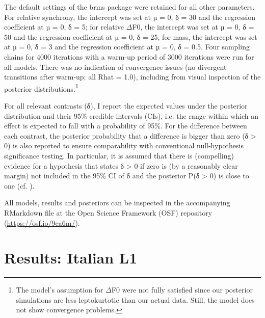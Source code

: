 The default settings of the brms package were retained for all other parameters. For relative synchrony, the intercept was set at µ = 0, δ = 30 and the regression coefficient at µ = 0, δ = 5; for relative ${\Delta}$F0, the intercept was set at µ = 0, δ = 50 and the regression coefficient at µ = 0, δ = 25, for mass, the intercept was set at µ = 0, δ = 3 and the regression coefficient at µ = 0, δ = 0.5. Four sampling chains for 4000 iterations with a warm-up period of 3000 iterations were run for all models. There was no indication of convergence issues (no divergent transitions after warm-up; all Rhat = 1.0), including from visual inspection of the posterior distributions.\footnote{The model’s assumption for \textrm{${\Delta}$}F0 were not fully satisfied since our posterior simulations are less leptokurtotic than our actual data. Still, the model does not show convergence problems.}

For all relevant contrasts (δ), I report the expected values under the posterior distribution and their 95\% credible intervals (CIs), i.e. the range within which an effect is expected to fall with a probability of 95\%. For the difference between each contrast, the posterior probability that a difference is bigger than zero (δ > 0) is also reported to ensure comparability with conventional null-hypothesis significance testing. In particular, it is assumed that there is (compelling) evidence for a hypothesis that states δ > 0 if zero is (by a reasonably clear margin) not included in the 95\% CI of δ and the posterior P(δ > 0) is close to one (cf. \citealt{FrankeRoettger2019}). 

All models, results and posteriors can be inspected in the accompanying RMarkdown file at the Open Science Framework (OSF) repository (\url{https://osf.io/9ca6m/}).

\section{Results: Italian L1}
\label{sec:2.3}
